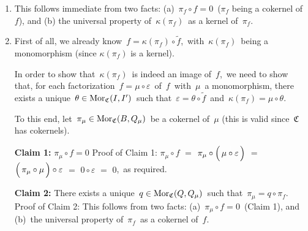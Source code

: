 \proof
\begin{enumerate}
\item
	This follows immediate from two facts:
	(a)	\,$\pi_{f} \circ f = 0$\, ($\pi_{f}$ being a cokernel of $f$), and
	(b)	the universal property of \,$\kappa(\pi_{f})$\, as a kernel of \,$\pi_{f}$.\,
\item
	First of all, we already know \,$f = \kappa(\pi_{f}) \circ \widetilde{f}$,\,
	with \,$\kappa(\pi_{f})$\, being a monomorphism (since $\kappa(\pi_{f})$ is a kernel).
	\begin{center}
	\end{center}
	In order to show that \,$\kappa(\pi_{f})$\, is indeed an image of \,$f$,\,
	we need to show that, for each factorization \,$f = \mu \circ \varepsilon$\, of \,$f$\,
	with \,$\mu$\, a monomorphism, there exists a unique \,$\theta \in \textnormal{Mor}_{\mathfrak{C}}(I,I^{\prime})$\,
	such that \,$\varepsilon = \theta \circ \widetilde{f}$\, and \,$\kappa(\pi_{f}) = \mu \circ \theta$.
	
	\vskip 0.1cm
	\noindent
	To this end, let \,$\pi_{\mu} \in \textnormal{Mor}_{\mathfrak{C}}(B,Q_{\mu})$\, be a cokernel of \,$\mu$
	(this is valid since \,{\color{red}$\mathfrak{C}$\, has cokernels}).\,

	\vskip 0.3cm
	\noindent
	\textbf{Claim 1:}\;\; $\pi_{\mu} \circ f = 0$
	\vskip -0.1cm
	\noindent
	Proof of Claim 1:\;
	$\pi_{\mu} \circ f$
	\;$=$\; $\pi_{\mu} \circ \left(\,\mu \overset{{\color{white}1}}{\circ}\varepsilon\,\right)$
	\;$=$\; $\left(\,\pi_{\mu} \overset{{\color{white}1}}{\circ} \mu \,\right) \circ \varepsilon$
	\;$=$\; $0 \circ \varepsilon$
	\;$=$\; $0$,\,
	as required.

	\vskip 0.3cm
	\noindent
	\textbf{Claim 2:}\;\; There exists a unique \,$q \in \textnormal{Mor}_{\mathfrak{C}}(Q,Q_{\mu})$\,
	such that \,$\pi_{\mu} = q \circ \pi_{f}$.\,
	\vskip 0.05cm
	\noindent
	Proof of Claim 2:\;
	This follows from two facts:\;
	(a)	\,$\pi_{\mu} \circ f = 0$\, (Claim 1), and
	(b)	\,the universal property of \,$\pi_{f}$\, as a cokernel of \,$f$.\,


\end{enumerate}
